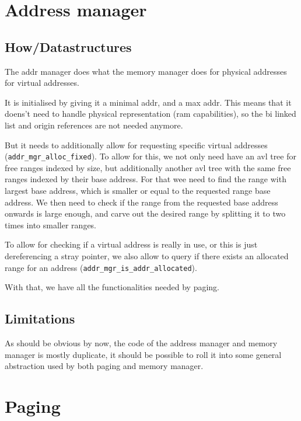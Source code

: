\section{Address manager}

\subsection{How/Datastructures}

The addr manager does what the memory manager does for physical addresses for
virtual addresses.

It is initialised by giving it a minimal addr, and a max addr.
This means that it doens't need to handle physical representation (ram
capabilities), so the bi linked list and origin references are not needed anymore.

But it needs to additionally allow for requesting specific virtual addresses
(\verb|addr_mgr_alloc_fixed|).
To allow for this, we not only need have an avl tree for free ranges indexed by
size, but additionally another avl tree with the same free ranges indexed by
their base address.
For that wee need to find the range with largest base address, which is smaller
or equal to the requested range base address.
We then need to check if the range from the requested base address onwards is
large enough, and carve out the desired range by splitting it to two times into
smaller ranges.

To allow for checking if a virtual address is really in use, or this is just
dereferencing a stray pointer, we also allow to query if there exists an
allocated range for an address (\verb|addr_mgr_is_addr_allocated|).

With that, we have all the functionalities needed by paging.

\subsection{Limitations}

As should be obvious by now, the code of the address manager and memory manager
is mostly duplicate, it should be possible to roll it into some general
abstraction used by both paging and memory manager.

\section{Paging}

